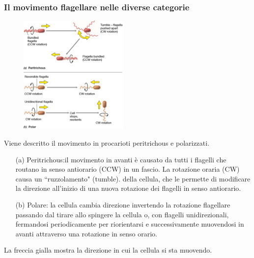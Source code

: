 \subsubsection{Il movimento flagellare nelle diverse categorie}
\begin{figure}
  \begin{center}
    \includegraphics[width=0.48\textwidth]{Pictures/18.png}
  \end{center}
\end{figure}
Viene descritto il movimento in procarioti peritrichous e polarizzati.
\begin{itemize}
	\item[(a)] Peritrichous:il movimento in avanti \`e causato da tutti i flagelli che routano in senso antiorario (CCW) in un fascio. La rotazione oraria (CW) causa un 
		``ruzzolamento" (tumble). della cellula, che le permette di modificare la direzione all'inizio di una nuova rotazione dei flagelli in senso antiorario. 
	\item[(b)] Polare: la cellula cambia direzione invertendo la rotazione flagellare passando dal tirare allo spingere la cellula o, con flagelli unidirezionali, fermandosi periodicamente per riorientarsi e successivamente 
		muovendosi in avanti attraverso una rotazione in senso orario. 
\end{itemize}
La freccia gialla mostra la direzione in cui la cellula si sta muovendo.
